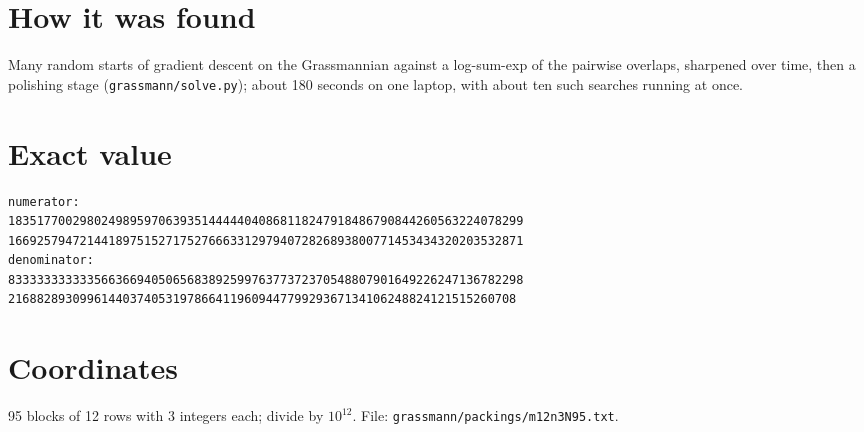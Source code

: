 \documentclass[11pt,a4paper]{article}
\begin{document}
\section{How it was found}
Many random starts of gradient descent on the Grassmannian against a log-sum-exp of the pairwise overlaps, sharpened over time, then a polishing stage (\texttt{grassmann/solve.py}); about 180 seconds on one laptop, with about ten such searches running at once.


\appendix
\section{Exact value}
{\small
\begin{verbatim}
numerator:
183517700298024989597063935144444040868118247918486790844260563224078299
166925794721441897515271752766633129794072826893800771453434320203532871
denominator:
833333333333566366940506568389259976377372370548807901649226247136782298
21688289309961440374053197866411960944779929367134106248824121515260708
\end{verbatim}}

\section{Coordinates}
95 blocks of 12 rows with 3 integers each; divide by $10^{12}$. File: \texttt{grassmann/packings/m12n3N95.txt}.
{\tiny
\begin{multicols}{3}
\end{multicols}}
\end{document}
